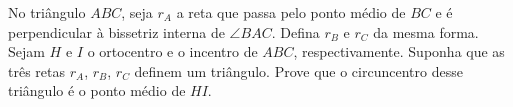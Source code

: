 No triângulo $ABC$, seja $r_A$ a reta que passa pelo ponto médio de $BC$ e é perpendicular à bissetriz interna de $\angle{BAC}$. Defina $r_B$ e $r_C$ da mesma forma. Sejam $H$ e $I$ o ortocentro e o incentro de $ABC$, respectivamente. Suponha que as três retas $r_A$, $r_B$, $r_C$ definem um triângulo. Prove que o circuncentro desse triângulo é o ponto médio de $HI$.